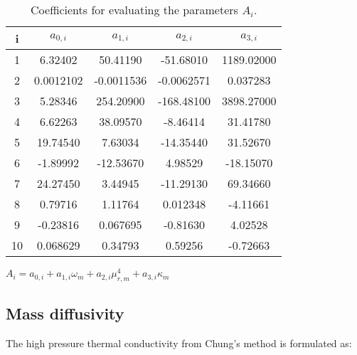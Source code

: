 \begin{table}
    \centering
    \caption{Coefficients for evaluating the parameters $A_i$.}\label{Ai_table}
    \begin{threeparttable} 
\begin{tabular*}{0.8\textwidth}{c|cccc}
    \toprule
    i     & $a_{0,i}$        & $a_{1,i}$         & $a_{2,i}$       & $a_{3,i}$   \\
    \midrule
    1     & 6.32402          & 50.41190          & -51.68010       & 1189.02000  \\
    2     & 0.0012102        & -0.0011536        & -0.0062571      & 0.037283    \\
    3     & 5.28346          & 254.20900         & -168.48100      & 3898.27000  \\
    4     & 6.62263          & 38.09570          & -8.46414        & 31.41780    \\
    5     & 19.74540         & 7.63034           & -14.35440       & 31.52670    \\
    6     & -1.89992         & -12.53670         & 4.98529         & -18.15070   \\
    7     & 24.27450         & 3.44945           & -11.29130       & 69.34660    \\
    8     & 0.79716          & 1.11764           & 0.012348        & -4.11661    \\
    9     & -0.23816         & 0.067695          & -0.81630        & 4.02528     \\
    10    & 0.068629         & 0.34793           & 0.59256         & -0.72663    \\
    \bottomrule
\end{tabular*}
\begin{tablenotes}
    \footnotesize    
    \item $A_{i} = a_{0,i} + a_{1,i}\omega_m + a_{2,i} \mu_{r,m}^4 + a_{3,i} \kappa_m$\\
  \end{tablenotes}
\end{threeparttable}
\end{table}

\subsection{Mass diffusivity}
The high pressure thermal conductivity from Chung's method \cite{chung1988generalized} is formulated as:


